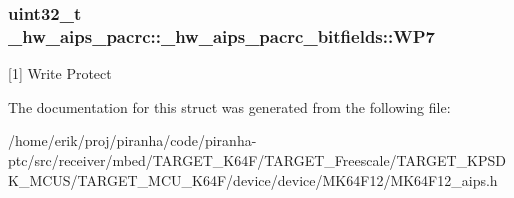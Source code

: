 \subsubsection[{\texorpdfstring{W\+P7}{WP7}}]{\setlength{\rightskip}{0pt plus 5cm}uint32\+\_\+t \+\_\+hw\+\_\+aips\+\_\+pacrc\+::\+\_\+hw\+\_\+aips\+\_\+pacrc\+\_\+bitfields\+::\+W\+P7}\hypertarget{struct__hw__aips__pacrc_1_1__hw__aips__pacrc__bitfields_afb776e02669ced81b66c844b7e4cb7ae}{}\label{struct__hw__aips__pacrc_1_1__hw__aips__pacrc__bitfields_afb776e02669ced81b66c844b7e4cb7ae}
\mbox{[}1\mbox{]} Write Protect 

The documentation for this struct was generated from the following file\+:\begin{DoxyCompactItemize}
\item 
/home/erik/proj/piranha/code/piranha-\/ptc/src/receiver/mbed/\+T\+A\+R\+G\+E\+T\+\_\+\+K64\+F/\+T\+A\+R\+G\+E\+T\+\_\+\+Freescale/\+T\+A\+R\+G\+E\+T\+\_\+\+K\+P\+S\+D\+K\+\_\+\+M\+C\+U\+S/\+T\+A\+R\+G\+E\+T\+\_\+\+M\+C\+U\+\_\+\+K64\+F/device/device/\+M\+K64\+F12/M\+K64\+F12\+\_\+aips.\+h\end{DoxyCompactItemize}
